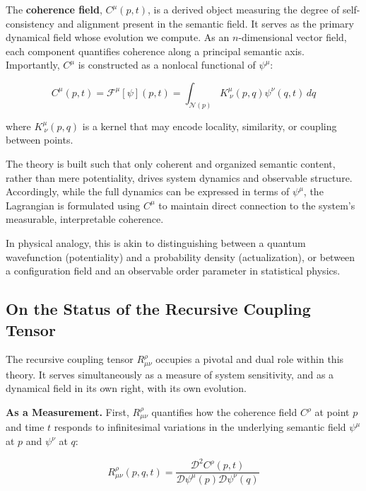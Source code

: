 The \textbf{coherence field}, \(C^\mu(p,t)\), is a derived object measuring the degree of self-consistency and alignment present in the semantic field. It serves as the primary dynamical field whose evolution we compute. As an \(n\)-dimensional vector field, each component quantifies coherence along a principal semantic axis. Importantly, \(C^\mu\) is constructed as a nonlocal functional of \(\psi^\mu\):

\begin{equation}
C^\mu(p,t) = \mathcal{F}^\mu[\psi](p,t) = \int_{\mathcal{N}(p)} K^\mu_{\ \nu}(p,q) \psi^\nu(q,t) \, dq
\end{equation}

where \(K^\mu_{\ \nu}(p,q)\) is a kernel that may encode locality, similarity, or coupling between points.

The theory is built such that only coherent and organized semantic content, rather than mere potentiality, drives system dynamics and observable structure. Accordingly, while the full dynamics can be expressed in terms of \(\psi^\mu\), the Lagrangian is formulated using \(C^\mu\) to maintain direct connection to the system's measurable, interpretable coherence.

In physical analogy, this is akin to distinguishing between a quantum wavefunction (potentiality) and a probability density (actualization), or between a configuration field and an observable order parameter in statistical physics.


\subsection{On the Status of the Recursive Coupling Tensor}
\label{2.4.7:on_the_status_of_the_recursive_coupling_tensor}

The recursive coupling tensor \(R^\rho_{\mu\nu}\) occupies a pivotal and dual role within this theory. It serves simultaneously as a measure of system sensitivity, and as a dynamical field in its own right, with its own evolution.

\textbf{As a Measurement.} First, \(R^\rho_{\mu\nu}\) quantifies how the coherence field \(C^\rho\) at point \(p\) and time \(t\) responds to infinitesimal variations in the underlying semantic field \(\psi^\mu\) at \(p\) and \(\psi^\nu\) at \(q\):

\begin{equation}
\label{eq:R_measurement}
R^\rho_{\mu\nu}(p, q, t) = \frac{\mathcal{D}^2 C^\rho(p, t)}{\mathcal{D} \psi^\mu(p) \mathcal{D} \psi^\nu(q)}
\end{equation}

